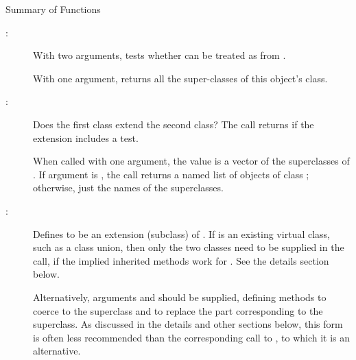 %
\begin{Section}{Summary of Functions}
\begin{description}

\item[:] 
With two arguments, tests whether  can be treated as from
.

With one argument, returns all the super-classes of this object's class.

\item[:] 
Does the first class extend the second class?
The call returns  if the extension includes a test.

When called with one argument, the value is a vector of the
superclasses of .  If argument   is
, the call returns a named list of objects of class
; otherwise, just the names of
the superclasses.

\item[:] 
Defines  to be an extension (subclass) of
.
If  is an existing virtual class, such as a class
union, then only the two classes need to be supplied in the
call, if the implied inherited methods work for .
See the details section below.

Alternatively, arguments  and  should
be supplied, defining methods to coerce to the superclass and to
replace the part corresponding to the superclass. As discussed in
the details and other sections below, this form is often less
recommended than the corresponding call to , to
which it is an alternative.


\end{description}

\end{Section}
%
